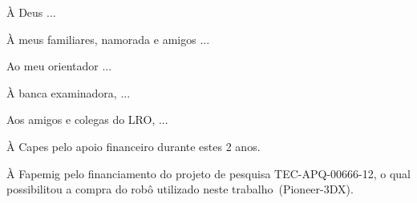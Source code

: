 \begin{agradecimentos}
À Deus ...

À meus familiares, namorada e amigos ...

Ao meu orientador ...

À banca examinadora, ...

Aos amigos e colegas do LRO, ...

À Capes pelo apoio financeiro durante estes 2 anos. 

À Fapemig pelo financiamento do projeto de pesquisa TEC-APQ-00666-12, o qual possibilitou a compra do robô utilizado neste trabalho~(Pioneer-3DX).
\end{agradecimentos}
\newpage